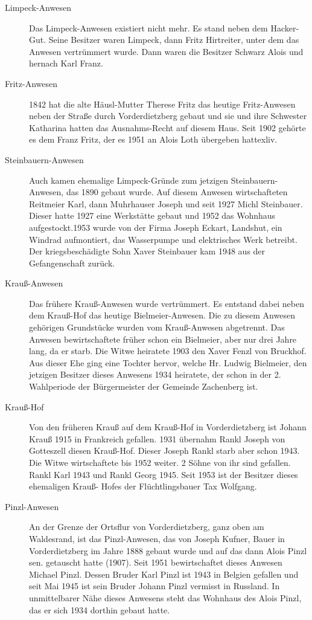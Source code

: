 \documentclass{book}
\begin{document}
\begin{description}
\item[Limpeck-Anwesen] Das Limpeck-Anwesen existiert nicht mehr. Es
stand neben dem Hacker-Gut. Seine Besitzer waren Limpeck, dann Fritz
Hirtreiter, unter dem das Anwesen vertrümmert wurde. Dann waren die
Besitzer Schwarz Alois und hernach Karl Franz.

\item[Fritz-Anwesen] 1842 hat die alte Häusl-Mutter Therese Fritz das
heutige Fritz-Anwesen neben der Straße durch Vorderdietzberg gebaut und
sie und ihre Schwester Katharina hatten das Ausnahms-Recht auf diesem
Haus. Seit 1902 gehörte es dem Franz Fritz, der es 1951 an Alois Loth
übergeben hattexliv.

\item[Steinbauern-Anwesen] Auch kamen ehemalige Limpeck-Gründe zum
jetzigen Steinbauern-Anwesen, das 1890 gebaut wurde. Auf diesem Anwesen
wirtschafteten Reitmeier Karl, dann Muhrhauser Joseph und seit 1927
Michl Steinbauer. Dieser hatte 1927 eine Werkstätte gebaut und 1952 das
Wohnhaus aufgestockt.1953 wurde von der Firma Joseph Eckart, Landshut,
ein Windrad aufmontiert, das Wasserpumpe und elektrisches Werk betreibt.
Der kriegsbeschädigte Sohn Xaver Steinbauer kam 1948 aus der
Gefangenschaft zurück.

\item[Krauß-Anwesen] Das frühere Krauß-Anwesen wurde vertrümmert. Es
entstand dabei neben dem Krauß-Hof das heutige Bielmeier-Anwesen. Die zu
diesem Anwesen gehörigen Grundstücke wurden vom Krauß-Anwesen
abgetrennt. Das Anwesen bewirtschaftete früher schon ein Bielmeier, aber
nur drei Jahre lang, da er starb. Die Witwe heiratete 1903 den Xaver
Fenzl von Bruckhof. Aus dieser Ehe ging eine Tochter hervor, welche Hr.
Ludwig Bielmeier, den jetzigen Besitzer dieses Anwesens 1934 heiratete,
der schon in der 2. Wahlperiode der Bürgermeister der Gemeinde
Zachenberg ist.

\item[Krauß-Hof] Von den früheren Krauß auf dem Krauß-Hof in
Vorderdietzberg ist Johann Krauß 1915 in Frankreich gefallen. 1931
übernahm Rankl Joseph von Gotteszell diesen Krauß-Hof. Dieser Joseph
Rankl starb aber schon 1943. Die Witwe wirtschaftete bis 1952 weiter. 2
Söhne von ihr sind gefallen. Rankl Karl 1943 und Rankl Georg 1945. Seit
1953 ist der Besitzer dieses ehemaligen Krauß- Hofes der
Flüchtlingsbauer Tax Wolfgang.

\item[Pinzl-Anwesen] An der Grenze der Ortsflur von Vorderdietzberg,
ganz oben am Waldesrand, ist das Pinzl-Anwesen, das von Joseph Kufner,
Bauer in Vorderdietzberg im Jahre 1888 gebaut wurde und auf das dann
Alois Pinzl sen. getauscht hatte (1907). Seit 1951 bewirtschaftet dieses
Anwesen Michael Pinzl. Dessen Bruder Karl Pinzl ist 1943 in Belgien
gefallen und seit Mai 1945 ist sein Bruder Johann Pinzl vermisst in
Russland. In unmittelbarer Nähe dieses Anwesens steht das Wohnhaus des
Alois Pinzl, das er sich 1934 dorthin gebaut hatte.
\end{description}
\end{document}
